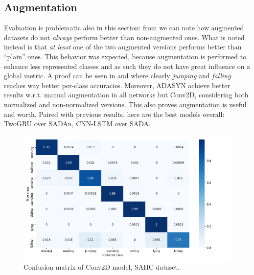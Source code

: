 \subsection{Augmentation}
Evaluation is problematic also in this section: from  we can note how augmented datasets do not \textit{always} perform better than non-augmented ones.
What is noted instead is that \textit{at least} one of the two augmented versions performs better than ``plain'' ones.
%
This behavior was expected, because augmentation is performed to enhance less represented classes and as such they do not have great influence on a global metric.
A proof can be seen in  and  where clearly \textit{jumping} and \textit{falling} reaches way better per-class accuracies.
Moreover, ADASYN achieve better results w.r.t. manual augmentation in all networks but Conv2D, considering both normalized and non-normalized versions.
This also proves augmentation is useful and worth.
Paired with previous results, here are the best models overall: TwoGRU over SADAn, CNN-LSTM over SADA.

\begin{figure}[ht]
\hspace*{+0.15cm}
    \centering
    \includegraphics[width=1.05\columnwidth]{images/plot-cm-SAHC_Conv2D.png}
    \caption{Confusion matrix of Conv2D model, SAHC dataset.}
    \label{fig:cm-sahc-conv2d}
\end{figure}

